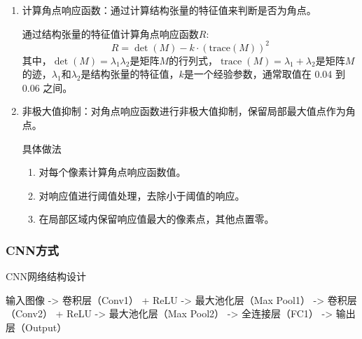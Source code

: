 \documentclass{lzureport}
\begin{document}
\begin{enumerate}[label=\arabic*)]
	\item 计算角点响应函数：通过计算结构张量的特征值来判断是否为角点。

	通过结构张量的特征值计算角点响应函数$R:$
	$$R=\det(M)-k\cdot(\mathrm{trace}(M))^2$$
	其中，$\det(M)=\lambda_1\lambda_2$是矩阵$M$的行列式，$\operatorname{trace}(M)=\lambda_1+\lambda_2$是矩阵$M$的迹，$\lambda_1$和$\lambda_2$是结构张量的特征值，$k$是一个经验参数，通常取值在 0.04 到 0.06 之间。

	\item 非极大值抑制：对角点响应函数进行非极大值抑制，保留局部最大值点作为角点。
	
	具体做法
	\begin{enumerate}[itemindent=1em,label=(\arabic*)]
		\item 对每个像素计算角点响应函数值。
		\item 对响应值进行阈值处理，去除小于阈值的响应。
		\item 在局部区域内保留响应值最大的像素点，其他点置零。
	\end{enumerate}
	
\end{enumerate}

\subsubsection{CNN方式}
CNN网络结构设计

输入图像 -> 卷积层（Conv1） + ReLU -> 最大池化层（Max Pool1） -> 卷积层（Conv2） + ReLU -> 最大池化层（Max Pool2） -> 全连接层（FC1） -> 输出层（Output）
\end{document}

